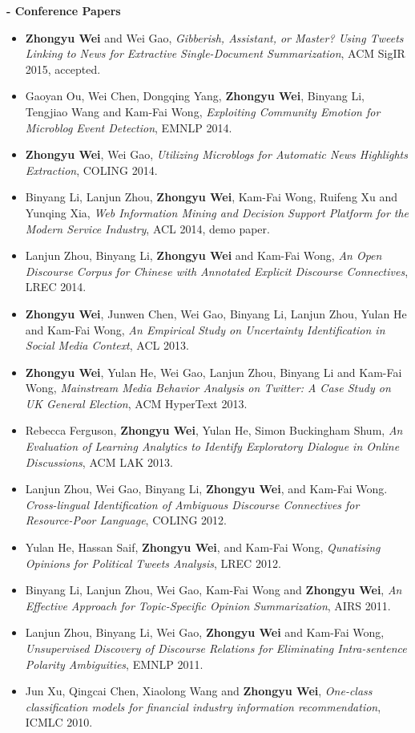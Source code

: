 \documentclass[9.5pt]{article}
\renewcommand{\section}[2]%
        {\pagebreak[3]\vspace{1.3\baselineskip}%
         \phantomsection\addcontentsline{toc}{section}{#1}%
         \hspace{0in}%
         \marginpar{
         \raggedright \scshape #1}#2}
\begin{document}
\section{Publications}
\textbf{- Conference Papers}
\begin{itemize}
	\item \textbf{Zhongyu Wei} and Wei Gao, \emph{Gibberish, Assistant, or Master? Using Tweets Linking to News for Extractive Single-Document Summarization}, ACM SigIR 2015, accepted.
	\item Gaoyan Ou, Wei Chen, Dongqing Yang, \textbf{Zhongyu Wei}, Binyang Li, Tengjiao Wang and Kam-Fai Wong, \emph{Exploiting Community Emotion for Microblog Event Detection},  EMNLP 2014.
	\item \textbf{Zhongyu Wei}, Wei Gao, \emph{Utilizing Microblogs for Automatic News Highlights Extraction}, COLING 2014.
	 \item Binyang Li, Lanjun Zhou, \textbf{Zhongyu Wei}, Kam-Fai Wong, Ruifeng Xu and Yunqing Xia, \emph{Web Information Mining and Decision Support Platform for the Modern Service Industry}, ACL 2014, demo paper.
	\item Lanjun Zhou, Binyang Li, \textbf{Zhongyu Wei} and Kam-Fai Wong, \emph{An Open Discourse Corpus for Chinese with Annotated Explicit Discourse Connectives}, LREC 2014.
	 \item \textbf{Zhongyu Wei}, Junwen Chen, Wei Gao, Binyang Li, Lanjun Zhou, Yulan He and Kam-Fai Wong, \emph{An Empirical Study on Uncertainty Identification in Social Media Context}, ACL 2013.
    \item \textbf{Zhongyu Wei}, Yulan He, Wei Gao, Lanjun Zhou, Binyang Li and Kam-Fai Wong, \emph{Mainstream Media Behavior Analysis on Twitter: A Case Study on UK General Election}, ACM HyperText 2013.
    \item Rebecca Ferguson, \textbf{Zhongyu Wei}, Yulan He, Simon Buckingham Shum, \emph{An Evaluation of Learning Analytics to Identify Exploratory Dialogue in Online Discussions},  ACM LAK 2013.
     \item  Lanjun Zhou, Wei Gao, Binyang Li, \textbf{Zhongyu Wei}, and Kam-Fai Wong. \emph{Cross-lingual Identification of Ambiguous Discourse Connectives for Resource-Poor Language}, COLING 2012.
      \item  Yulan He, Hassan Saif, \textbf{Zhongyu Wei}, and Kam-Fai Wong, \emph{Qunatising Opinions for Political Tweets Analysis}, LREC 2012.
      \item  Binyang Li, Lanjun Zhou, Wei Gao, Kam-Fai Wong and \textbf{Zhongyu Wei}, \emph{An Effective Approach for Topic-Specific Opinion Summarization}, AIRS 2011.
    \item  Lanjun Zhou, Binyang Li, Wei Gao, \textbf{Zhongyu Wei} and Kam-Fai Wong, \emph{Unsupervised Discovery of Discourse Relations for Eliminating Intra-sentence Polarity Ambiguities}, EMNLP 2011.
    \item  Jun Xu, Qingcai Chen, Xiaolong Wang and \textbf{Zhongyu Wei}, \emph{One-class classification models for financial industry information recommendation}, ICMLC 2010.
\end{itemize}
\end{document}
